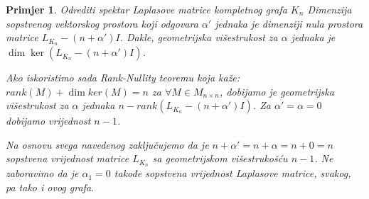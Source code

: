 \documentclass[11pt]{article}
\newtheorem{example}{Primjer}
\begin{document}
\begin{example}{Odrediti spektar Laplasove matrice kompletnog grafa $K_n$}
	Dimenzija sopstvenog vektorskog prostora koji odgovara $\alpha'$ jednaka je dimenziji nula prostora matrice $L_{K_n} - (n + \alpha') I$.
	Dakle, geometrijska višestrukost za  $\alpha$ jednaka je $\dim \ker(L_{K_n} - (n + \alpha') I)$.

	Ako iskoristimo sada Rank-Nullity teoremu koja kaže: \\
	$rank(M) + \dim ker(M) = n$ za $\forall M \in M_{n \times n}$,
	dobijamo je geometrijska višestrukost za $\alpha$ jednaka
	$n - rank(L_{K_n} - (n + \alpha') I)$.
	Za $\alpha' = \alpha = 0$ dobijamo vrijednost $n-1$.
	
	Na osnovu svega navedenog zaključujemo da je $n + \alpha' = n + \alpha = n + 0 = n$ sopstvena vrijednost matrice $L_{K_n}$ sa geometrijskom višestrukošću $n-1$. Ne zaboravimo da je $\alpha_1=0$ takođe sopstvena vrijednost Laplasove matrice, svakog, pa tako i ovog grafa.
	

\end{example}
\end{document}
